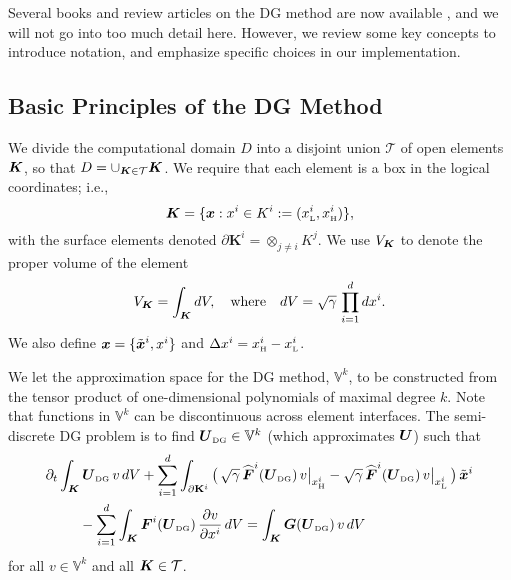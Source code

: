 \documentclass[10pt,preprint]{aastex}
\newcommand{\dx}{\Delta x}
\newcommand{\pbK}{\partial\mathbf{K}}
\newcommand{\sumx}{\sum_{i=1}^{d}}
\begin{document}
Several books and review articles on the DG method are now available \citep[see, e.g.,][]{cockburnShu_2001,hesthavenWarburton_2008}, and we will not go into too much detail here.  
However, we review some key concepts to introduce notation, and emphasize specific choices in our implementation.  

\subsection{Basic Principles of the DG Method}

We divide the computational domain $D$ into a disjoint union $\mathcal{T}$ of open elements $\boldsymbol{K}$, so that $D = \cup_{\boldsymbol{K} \in \mathcal{T}}\boldsymbol{K}$.  
We require that each element is a box in the logical coordinates; i.e.,
\begin{equation}
  \boldsymbol{K}=\{\boldsymbol{x} : x^{i} \in K^{i} := (x_{\mbox{\tiny L}}^{i},x_{\mbox{\tiny H}}^{i})\}, 
\end{equation}
with the surface elements denoted $\pbK^{i}=\otimes_{j\ne i}K^{j}$.  
We use $V_{\boldsymbol{K}}$ to denote the proper volume of the element
\begin{equation}
  V_{\boldsymbol{K}} = \int_{\boldsymbol{K}}dV, \quad\text{where}\quad dV = \sqrt{\gamma}\,\prod_{i=1}^{d}dx^{i}.  
\end{equation}
We also define $\boldsymbol{x}=\{\tilde{\boldsymbol{x}}^{i},x^{i}\}$ and $\dx^{i}=\xH^{i}-\xL^{i}$.  

We let the approximation space for the DG method, $\mathbb{V}^{k}$, to be constructed from the tensor product of one-dimensional polynomials of maximal degree $k$.  
Note that functions in $\mathbb{V}^{k}$ can be discontinuous across element interfaces.  
The semi-discrete DG problem is to find $\boldsymbol{U}_{\mbox{\tiny DG}}\in\mathbb{V}^{k}$ (which approximates $\boldsymbol{U}$) such that
\begin{align}
  &\partial_{t}\int_{\bK}\bU_{\DG}\,v\,dV
  +\sumx\int_{\pbK^{i}}\big(\,\sqrt{\gamma}\,\widehat{\vect{F}}^{i}(\bU_{\DG})\,v\big|_{\xH^{i}}-\sqrt{\gamma}\,\widehat{\vect{F}}^{i}(\bU_{\DG})\,v\big|_{\xL^{i}}\,\big)\,\tilde{\bx}^{i} \nonumber \\
  &\hspace{24pt}
  -\sumx\int_{\bK}\vect{F}^{i}(\bU_{\DG})\,\pderiv{v}{x^{i}}\,dV
  =\int_{\bK}\bG(\bU_{\DG})\,v\,dV
  \label{eq:semidiscreteDG}
\end{align}
for all $v\in\mathbb{V}^{k}$ and all $\boldsymbol{K}\in\mathcal{T}$.  
\end{document}
